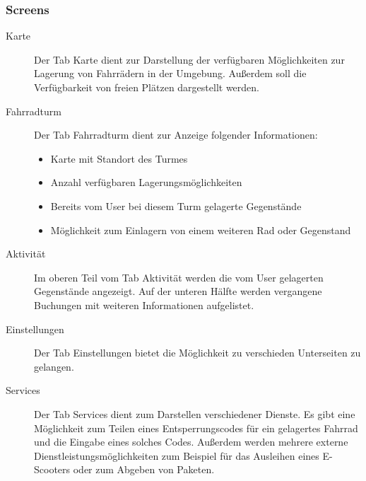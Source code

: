 \subsubsection{Screens}
\begin{description}
    \item[Karte] Der Tab Karte dient zur Darstellung der verfügbaren Möglichkeiten zur Lagerung von Fahrrädern in der Umgebung. Außerdem soll die Verfügbarkeit von freien Plätzen dargestellt werden.
\end{description}
\begin{description}
    \item[Fahrradturm] Der Tab Fahrradturm dient zur Anzeige folgender Informationen:

          \begin{itemize}
              \item Karte mit Standort des Turmes
              \item Anzahl verfügbaren Lagerungsmöglichkeiten
              \item Bereits vom User bei diesem Turm gelagerte Gegenstände
              \item Möglichkeit zum Einlagern von einem weiteren Rad oder Gegenstand
          \end{itemize}
\end{description}

\begin{description}
    \item[Aktivität] Im oberen Teil vom Tab Aktivität werden die vom User gelagerten Gegenstände angezeigt. Auf der unteren Hälfte werden vergangene Buchungen mit weiteren Informationen aufgelistet.
\end{description}

\begin{description}
    \item[Einstellungen] Der Tab Einstellungen bietet die Möglichkeit zu verschieden Unterseiten zu gelangen.
\end{description}
\begin{description}
    \item[Services] Der Tab Services dient zum Darstellen verschiedener Dienste. Es gibt eine Möglichkeit zum Teilen eines Entsperrungscodes für ein gelagertes Fahrrad und die Eingabe eines solches Codes. Außerdem werden mehrere externe Dienstleistungsmöglichkeiten zum Beispiel für das Ausleihen eines E-Scooters oder zum Abgeben von Paketen.
\end{description}




